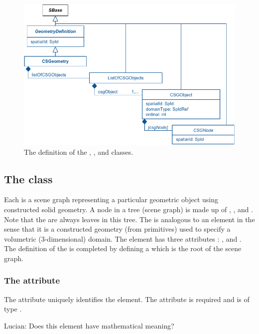 \begin{figure}[ht]
  \includegraphics{figs/CSGeometry-uml}
  \caption{The definition of the \CSGeometry, \ListOfCSGObjects, and \CSGObject classes.}
  \label{CSGeometry-uml}
  \label{ListOfCSGObjects-uml}
  \label{CSGObject-uml}
\end{figure}



\subsection{The  class}
\label{CSGObject-class}
Each \CSGObject is a scene graph representing a particular geometric object using constructed solid geometry. A node in a tree (scene graph) is made up of \CSGPrimitives, \CSGSetOperators, and \CSGTransformations.  Note that the \CSGPrimitives are always leaves in this tree. The \CSGObject is analogous to an \AnalyticVolume element in the sense that it is a constructed geometry (from primitives) used to specify a volumetric (3-dimensional) domain. The \CSGObject element has three attributes : ,  and . The definition of the \CSGObject is completed by defining a \CSGNode which is the root of the \CSGObject scene graph.

\subsubsection{The  attribute}
The  attribute uniquely identifies the \CSGObject element. The attribute is required and is of type . 

{\color{red} Lucian: \notice Does this element have mathematical meaning?}

